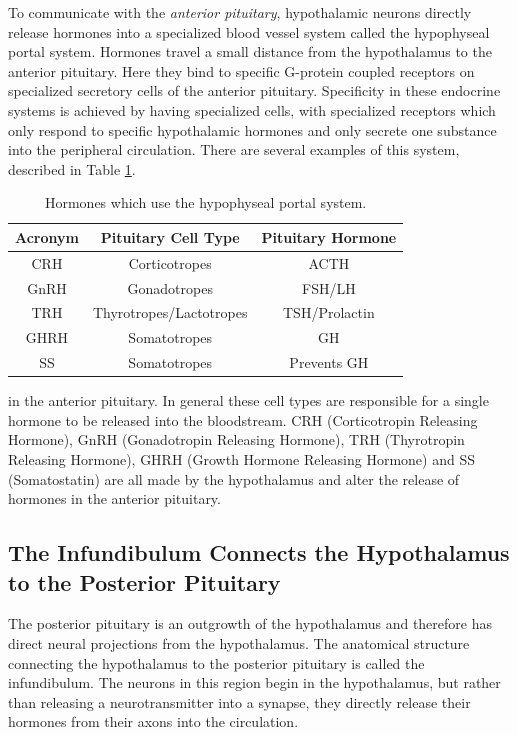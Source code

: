 \documentclass{tufte-handout}
\begin{document}
To communicate with the \emph{anterior pituitary}, hypothalamic neurons directly release hormones into a specialized blood vessel system called the hypophyseal portal system.  Hormones travel a small distance from the hypothalamus to the anterior pituitary.  Here they bind to specific G-protein coupled receptors on specialized secretory cells of the anterior pituitary.  Specificity in these endocrine systems is achieved by having specialized cells, with specialized receptors which only respond to specific hypothalamic hormones and only secrete one substance into the peripheral circulation.  There are several examples of this system, described in Table \ref{tab:anterior-pituitary-hormones}.

\begin{table}
  \centering
  \begin{tabular}{ccc}
    \toprule
    Acronym & Pituitary Cell Type & Pituitary Hormone \\
    \midrule
    CRH & Corticotropes & ACTH \\
    GnRH & Gonadotropes & FSH/LH\\
    TRH& Thyrotropes/Lactotropes & TSH/Prolactin \\
    GHRH & Somatotropes & GH \\
    SS & Somatotropes & Prevents GH \\
    \bottomrule
  \end{tabular}
  \caption{Hormones which use the hypophyseal portal system.}
  \label{tab:anterior-pituitary-hormones}
\end{table}

 in the anterior pituitary.  In general these cell types are responsible for a single hormone to be released into the bloodstream.  CRH (Corticotropin Releasing Hormone), GnRH (Gonadotropin Releasing Hormone), TRH (Thyrotropin Releasing Hormone), GHRH (Growth Hormone Releasing Hormone) and SS (Somatostatin) are all made by the hypothalamus and alter the release of hormones in the anterior pituitary.  

\subsection{The Infundibulum Connects the Hypothalamus to the Posterior Pituitary}

The posterior pituitary is an outgrowth of the hypothalamus and therefore has direct neural projections from the hypothalamus.  The anatomical structure connecting the hypothalamus to the posterior pituitary is called the infundibulum. The neurons in this region begin in the hypothalamus, but rather than releasing a neurotransmitter into a synapse, they directly release their hormones from their axons into the circulation.
\end{document}
